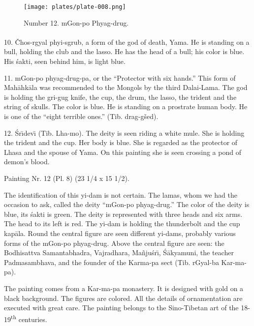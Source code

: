 \documentclass[a4paper, 12pt, oneside]{article}
\begin{document}
\clearpage
\vspace*{\fill}
\begin{figure}[H]
\centering
\texttt{[image: plates/plate-008.png]}
\caption*{Number 12. mGon-po Phyag-drug.}
\end{figure}
\vspace*{\fill}
\clearpage
\paragraph{}
10. Čhos-rgyal phyi-sgrub, a form of the god of death, Yama. He is standing on a bull, holding the club and the lasso. He has the head of a bull; his color is blue. His \'{s}akti, seen behind him, is light blue.

11. mGon-po phyag-drug-pa, or the ``Protector with six hands.'' This form of Mah\={a}hk\={a}la was recommended to the Mongols by the third Dalai-Lama. The god is holding the gri-gug knife, the cup, the drum, the lasso, the trident and the string of skulls. The color is blue. He is standing on a prostrate human body. He is one of the ``eight terrible ones.'' (Tib. drag-gšed).

12. \'{S}r\={\i}dev\={\i} (Tib. Lha-mo). The deity is seen riding a white mule. She is holding the trident and the cup. Her body is blue. She is regarded as the protector of Lhasa and the spouse of Yama. On this painting she is seen crossing a pond of demon's blood.

\bigskip

Painting Nr. 12 (Pl. 8) (23 1/4 x 15 1/2).

\bigskip

The identification of this yi-dam is not certain. The lamas, whom we had the occasion to ask, called the deity ``mGon-po phyag-drug.'' The color of the deity is blue, its \'{s}akti is green. The deity is represented with three heads and six arms. The head to its left is red. The yi-dam is holding the thunderbolt and the cup kap\={a}la. Round the central figure are seen different yi-dams, probably various forms of the mGon-po phyag-drug. Above the central figure are seen: the Bodhisattva Samantabhadra, Vajradhara, Ma\~{n}ju\'{s}r\={\i}, \'{S}\={a}kyamuni, the teacher Padmasambhava, and the founder of the Karma-pa sect (Tib. rGyal-ba Kar-ma-pa).

The painting comes from a Kar-ma-pa monastery. It is designed with gold on a black background. The figures are colored. All the details of ornamentation are executed with great care. The painting belongs to the Sino-Tibetan art of the 18-19\textsuperscript{th} centuries.
\end{document}
